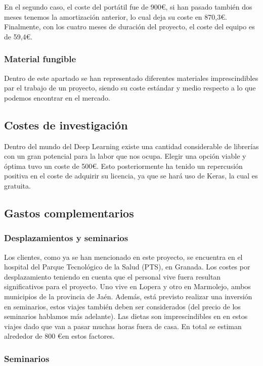 En el segundo caso, el coste del portátil fue de 900\euro, si han pasado también dos meses tenemos la amortización anterior, lo cual deja su coste en 870,3\euro. Finalmente, con los cuatro meses de duración del proyecto, el coste del equipo es de 59,4\euro.

\subsubsection{Material fungible}

Dentro de este apartado se han representado diferentes materiales imprescindibles par el trabajo de un proyecto, siendo su coste estándar y medio respecto a lo que podemos encontrar en el mercado.

\subsection{Costes de investigación}

Dentro del mundo del Deep Learning existe una cantidad considerable de librerías con un gran potencial para la labor que nos ocupa. Elegir una opción viable y óptima tuvo un coste de 500\euro. Esto posteriormente ha tenido un repercusión positiva en el coste de adquirir su licencia, ya que se hará uso de Keras, la cual es gratuita.

\subsection{Gastos complementarios}

\subsubsection{Desplazamientos y seminarios}

Los clientes, como ya se han mencionado en este proyecto, se encuentra en el hospital del Parque Tecnológico de la Salud (PTS), en Granada. Los costes por desplazamiento teniendo en cuenta que el personal vive fuera resultan significativos para el proyecto. Uno vive en Lopera y otro en Marmolejo, ambos municipios de la provincia de Jaén. Además, está previsto realizar una inversión en seminarios, estos viajes también deben ser considerados (del precio de los seminarios hablamos más adelante). Las dietas son imprescindibles en en estos viajes dado que van a pasar muchas horas fuera de casa. En total se estiman alrededor de 800 \euro en estos factores.  

\subsubsection{Seminarios}

